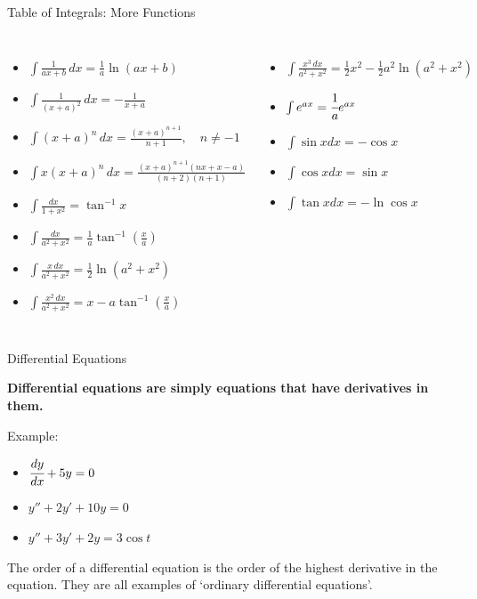 \documentclass[aspectratio=169,xcolor=dvipsnames,svgnames,x11names,fleqn]{beamer}
\begin{document}
\begin{frame}{Table of Integrals: More Functions}
\begin{columns}
    \begin{itemize}
    \item $\int \frac{1}{ax + b} \, dx = \frac{1}{a} \ln(ax + b)$
    \item $\int \frac{1}{(x + a)^2} \, dx = -\frac{1}{x + a}$
    \item $\int (x + a)^n \, dx = \frac{(x + a)^{n+1}}{n+1}, \quad n \neq -1$
    \item $\int x(x + a)^n \, dx = \frac{(x + a)^{n+1}(nx + x - a)}{(n+2)(n+1)}$
    \item $\int \frac{dx}{1 + x^2} = \tan^{-1} x$
    \item $\int \frac{dx}{a^2 + x^2} = \frac{1}{a} \tan^{-1} \left(\frac{x}{a}\right)$
    \item $\int \frac{x \, dx}{a^2 + x^2} = \frac{1}{2} \ln(a^2 + x^2)$
    \item $\int \frac{x^2 \, dx}{a^2 + x^2} = x - a \tan^{-1} \left(\frac{x}{a}\right)$
\end{itemize}

\begin{itemize}
     
    \item $\int \frac{x^3 \, dx}{a^2 + x^2} = \frac{1}{2} x^2 - \frac{1}{2} a^2 \ln(a^2 + x^2)$
    \item $\int e^{ax} = \cfrac{1}{a}e^{ax}$
    \item $\int \sin x dx = -\cos x$
    \item $\int \cos x dx = \sin x$
    \item $\int \tan x dx = -\ln \cos x$
    
\end{itemize}
\end{columns}
\end{frame}

\begin{frame}{Differential Equations}
    \begin{center}
        \bf
        Differential equations are simply equations that have derivatives in them.
    \end{center}
Example:
\begin{itemize}
    \item $\cfrac{dy}{dx} +  5 y = 0$
    \item $y'' + 2y' + 10 y  = 0$
    \item $y'' + 3y' + 2y = 3\cos t$
    
\end{itemize}
    The order of a differential equation is the order of the highest derivative in the equation. They are all examples of `ordinary differential equations'.
\end{frame}
\end{document}
